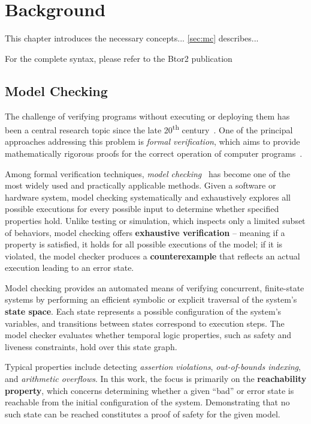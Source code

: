 \chapter{Background}

This chapter introduces the necessary concepts... %
\autoref{sec:mc} describes... %

For the complete syntax, please refer to the Btor2 publication~\cite{btor2}


\section{Model Checking}\label{sec:mc}

The challenge of verifying programs without executing or deploying them has been a central research topic since the late 20\textsuperscript{th} century~\cite{systemEngineering}. One of the principal approaches addressing this problem is \textit{formal verification}, which aims to provide mathematically rigorous proofs for the correct operation of computer programs~\cite{MC}.

Among formal verification techniques, \textit{model checking}~\cite{modelChecking, modelChecking2} has become one of the most widely used and practically applicable methods. Given a software or hardware system, model checking systematically and exhaustively explores all possible executions for every possible input to determine whether specified properties hold. Unlike testing or simulation, which inspects only a limited subset of behaviors, model checking offers \textbf{exhaustive verification} -- meaning if a property is satisfied, it holds for all possible executions of the model; if it is violated, the model checker produces a \textbf{counterexample} that reflects an actual execution leading to an error state.

Model checking provides an automated means of verifying concurrent, finite-state systems by performing an efficient symbolic or explicit traversal of the system's \textbf{state space}. Each state represents a possible configuration of the system's variables, and transitions between states correspond to execution steps. The model checker evaluates whether temporal logic properties, such as safety and liveness constraints, hold over this state graph.~\cite{hardware_MC}

Typical properties include detecting \textit{assertion violations}, \textit{out-of-bounds indexing}, and \textit{arithmetic overflows}. In this work, the focus is primarily on the \textbf{reachability property}, which concerns determining whether a given “bad” or error state is reachable from the initial configuration of the system. Demonstrating that no such state can be reached constitutes a proof of safety for the given model.

